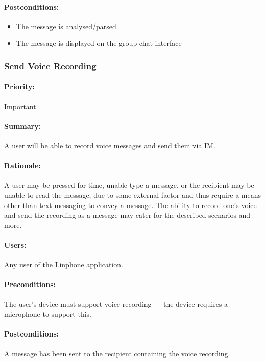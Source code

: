\documentclass[11pt]{article}
\begin{document}
\paragraph{{Postconditions:}}
\begin{itemize}
\item The message is analysed/parsed
\item The message is displayed on the group chat interface
\end{itemize}

\subsubsection{Send Voice Recording} \label{UC-send-voice}
\paragraph{Priority:} Important
\paragraph{Summary:} A user will be able to record voice messages and send them via IM.
\paragraph{Rationale:} A user may be pressed for time, unable type a message, or the recipient may be unable to read the message, due to some external factor and thus require a means other than text messaging to convey a message. The ability to record one's voice and send the recording as a message may cater for the described scenarios and more.
\paragraph{Users:} Any user of the Linphone application.
\paragraph{Preconditions:} The user's device must support voice recording --- the device requires a microphone to support this.
\paragraph{{Postconditions:}} A message has been sent to the recipient containing the voice recording.
\end{document}

